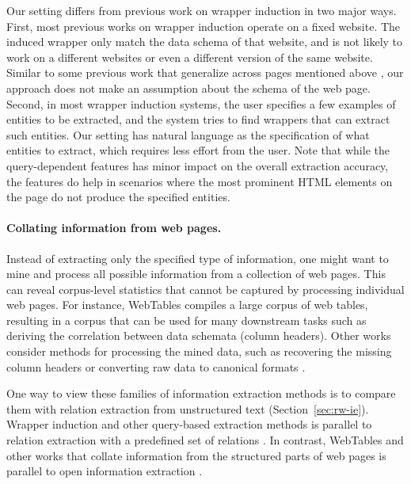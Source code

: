 Our setting differs from previous work on wrapper induction
in two major ways.
First, most previous works on wrapper induction
operate on a fixed website.
The induced wrapper only match the data schema of that website,
and is not likely to work on a different websites
or even a different version of the same website.
Similar to some previous work that generalize across pages
mentioned above
\cite{wong2009scalable,zhang2013automatic},
our approach does not make an assumption about the schema of the web page.
Second, in most wrapper induction systems,
the user specifies a few examples of entities to be extracted,
and the system tries to find wrappers that can extract
such entities.
Our setting has natural language as the specification
of what entities to extract,
which requires less effort from the user.
Note that 
while the query-dependent features has minor impact
on the overall extraction accuracy,
the features do help in scenarios where the most
prominent HTML elements on the page do not produce
the specified entities.

\paragraph{Collating information from web pages.}
Instead of extracting only the specified type of information,
one might want to mine and process all possible information
from a collection of web pages.
This can reveal corpus-level statistics that cannot be captured
by processing individual web pages.
For instance, WebTables \cite{cafarella2008webtables}
compiles a large corpus of web tables,
resulting in a corpus that can be used for many downstream tasks
such as deriving the correlation between data schemata (column headers).
Other works consider methods for processing
the mined data,
such as recovering the missing column headers \cite{venetis2011recovering}
or converting raw data to canonical formats
\cite{sarawagi2014open,embley2016converting}.

One way to view these families of information extraction methods
is to compare them with relation extraction from unstructured text (Section~\ref{sec:rw-ie}).
Wrapper induction and other query-based extraction methods
is parallel to relation extraction with
a predefined set of relations \cite{hearst1992automatic,mintz2009distant,miwa2016end}.
In contrast, WebTables and other works that collate information
from the structured parts of web pages
is parallel to open information extraction
\cite{banko2007open,fader11reverb,etzioni11openie,masaum2012open}.

